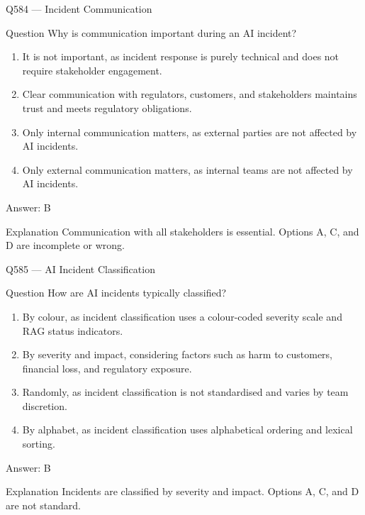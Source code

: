 \documentclass[aspectratio=169,8pt]{beamer}
\begin{document}
	\begin{frame}{Q584 --- Incident Communication}
		\begin{block}{Question}
			Why is communication important during an AI incident?
			\begin{enumerate}
				\item It is not important, as incident response is purely technical and does not require stakeholder engagement.
				\item Clear communication with regulators, customers, and stakeholders maintains trust and meets regulatory obligations.
				\item Only internal communication matters, as external parties are not affected by AI incidents.
				\item Only external communication matters, as internal teams are not affected by AI incidents.
			\end{enumerate}
		\end{block}
		\begin{exampleblock}{Answer: B}\end{exampleblock}
		\begin{block}{Explanation}
			Communication with all stakeholders is essential. Options A, C, and D are incomplete or wrong.
		\end{block}
	\end{frame}
	
	\begin{frame}{Q585 --- AI Incident Classification}
		\begin{block}{Question}
			How are AI incidents typically classified?
			\begin{enumerate}
				\item By colour, as incident classification uses a colour-coded severity scale and RAG status indicators.
				\item By severity and impact, considering factors such as harm to customers, financial loss, and regulatory exposure.
				\item Randomly, as incident classification is not standardised and varies by team discretion.
				\item By alphabet, as incident classification uses alphabetical ordering and lexical sorting.
			\end{enumerate}
		\end{block}
		\begin{exampleblock}{Answer: B}\end{exampleblock}
		\begin{block}{Explanation}
			Incidents are classified by severity and impact. Options A, C, and D are not standard.
		\end{block}
	\end{frame}
	
\end{document}
